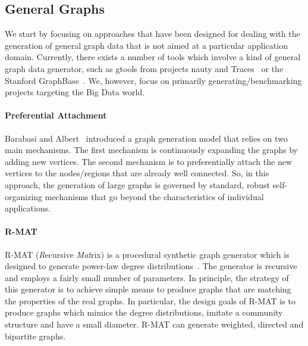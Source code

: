 \subsection{General Graphs}
\label{sec:generators_general}

We start by focusing on approaches that have been designed for dealing with the generation of general graph
data that is not aimed at a particular application domain. Currently, there exists a
number of tools which involve a kind of general graph data generator, such as
gtools from projects nauty and Traces~\cite{gtools} or the Stanford
GraphBase~\cite{GraphBase}. We, however, focus on primarily
generating/benchmarking projects targeting the Big Data world.


\paragraph {Preferential Attachment} Barabasi and Albert~\cite{Barabasi99emergenceScaling} introduced a graph generation model that relies on two main mechanisms. The first mechanism is continuously expanding the graphs by adding new vertices. The second mechanism is to preferentially attach the new vertices   to the nodes/regions that are already well connected. So, in this approach, the generation of large graphs is governed by standard, robust self-organizing mechanisms that go beyond the characteristics of individual applications.

\paragraph {R-MAT} R-MAT (\emph{R}ecursive \emph{Mat}rix) is a procedural synthetic graph generator which is designed to generate power-law degree
distributions~\cite{DBLP:conf/sdm/ChakrabartiZF04}.
The generator is recursive and employs a fairly small number of parameters.
In principle, the strategy of this generator is to achieve simple means to produce graphs that are matching 
the properties of the real graphs. In particular, the design goals of R-MAT is to produce graphs which mimics the degree distributions, imitate a community structure and have a small diameter. R-MAT can generate weighted, directed and bipartite graphs.


